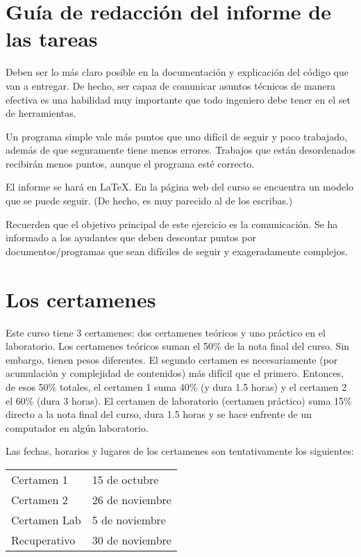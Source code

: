 \documentclass[11pt]{article}
\begin{document}
\section{Gu\'ia de redacci\'on del informe de las tareas}
\label{sec:guide}

Deben ser lo m\'as claro posible en la documentaci\'on y explicaci\'on del
c\'odigo que van a entregar. De hecho, ser capaz de comunicar asuntos
t\'ecnicos de manera efectiva es una habilidad muy importante que todo
ingeniero debe tener en el set de herramientas.

Un programa simple vale m\'as puntos que uno dif\'icil de seguir y poco
trabajado, adem\'as de que seguramente tiene menos errores. Trabajos que
est\'an desordenados recibir\'an menos puntos, aunque el programa est\'e
correcto.

El informe se har\'a en \LaTeX. En la p\'agina web del curso se encuentra
un modelo que se puede seguir. (De hecho, es muy parecido al de los
escribas.)

Recuerden que el objetivo principal de este ejercicio es la
comunicaci\'on. Se ha informado a los ayudantes que deben descontar
puntos por documentos/programas que sean dif\'iciles de seguir y
exageradamente complejos.

\section{Los certamenes}
\label{sec:certamenes}

Este curso tiene 3 certamenes: dos certamenes te\'oricos y uno pr\'actico
en el laboratorio. Los certamenes te\'oricos suman el 50\% de la nota
final del curso. Sin embargo, tienen pesos diferentes. El segundo
certamen es necesariamente (por acumulaci\'on y complejidad de
contenidos) m\'as dif\'icil que el primero. Entonces, de esos 50\%
totales, el certamen 1 suma 40\% (y dura 1.5 horas) y el certamen 2 el
60\% (dura 3 horas). El certamen de laboratorio (certamen pr\'actico)
suma 15\% directo a la nota final del curso, dura 1.5 horas y se hace
enfrente de un computador en alg\'un laboratorio.

Las fechas, horarios y lugares de los certamenes son tentativamente
los siguientes:

\begin{table}[h]
  \centering
  \begin{tabular}[h]{ll}
    Certamen 1 & 15 de octubre\\
    Certamen 2 & 26 de noviembre\\
    Certamen Lab & 5 de noviembre\\
    Recuperativo & 30 de noviembre\\
  \end{tabular}
\end{table}
\end{document}
